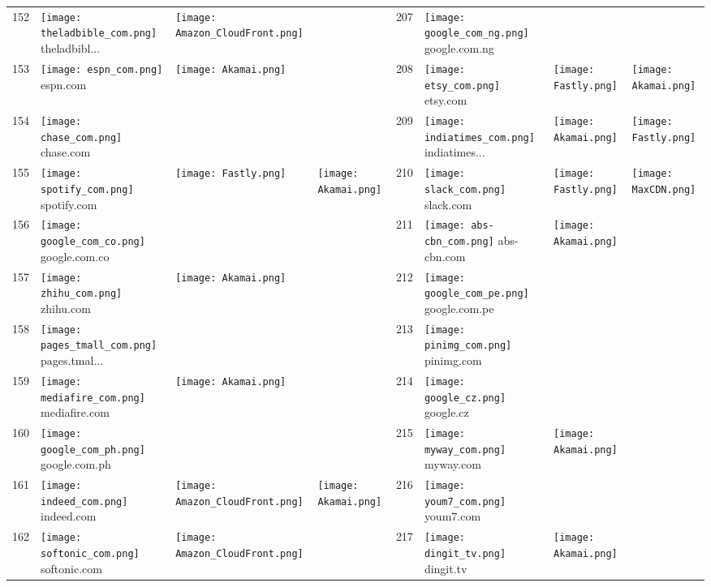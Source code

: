 \begin{table}[]
\begin{tabular}{|llll|llll|}
152 & \texttt{[image: theladbible\_com.png]} theladbibl... & \texttt{[image: Amazon\_CloudFront.png]} & & 207 & \texttt{[image: google\_com\_ng.png]} google.com.ng & & \\
153 & \texttt{[image: espn\_com.png]} espn.com & \texttt{[image: Akamai.png]} & & 208 & \texttt{[image: etsy\_com.png]} etsy.com & \texttt{[image: Fastly.png]} & \texttt{[image: Akamai.png]} \\
154 & \texttt{[image: chase\_com.png]} chase.com & & & 209 & \texttt{[image: indiatimes\_com.png]} indiatimes... & \texttt{[image: Akamai.png]} & \texttt{[image: Fastly.png]} \\
155 & \texttt{[image: spotify\_com.png]} spotify.com & \texttt{[image: Fastly.png]} & \texttt{[image: Akamai.png]} & 210 & \texttt{[image: slack\_com.png]} slack.com & \texttt{[image: Fastly.png]} & \texttt{[image: MaxCDN.png]} \\
156 & \texttt{[image: google\_com\_co.png]} google.com.co & & & 211 & \texttt{[image: abs-cbn\_com.png]} abs-cbn.com & \texttt{[image: Akamai.png]} & \\
157 & \texttt{[image: zhihu\_com.png]} zhihu.com & \texttt{[image: Akamai.png]} & & 212 & \texttt{[image: google\_com\_pe.png]} google.com.pe & & \\
158 & \texttt{[image: pages\_tmall\_com.png]} pages.tmal... & & & 213 & \texttt{[image: pinimg\_com.png]} pinimg.com & & \\
159 & \texttt{[image: mediafire\_com.png]} mediafire.com & \texttt{[image: Akamai.png]} & & 214 & \texttt{[image: google\_cz.png]} google.cz & & \\
160 & \texttt{[image: google\_com\_ph.png]} google.com.ph & & & 215 & \texttt{[image: myway\_com.png]} myway.com & \texttt{[image: Akamai.png]} & \\
161 & \texttt{[image: indeed\_com.png]} indeed.com & \texttt{[image: Amazon\_CloudFront.png]} & \texttt{[image: Akamai.png]} & 216 & \texttt{[image: youm7\_com.png]} youm7.com & & \\
162 & \texttt{[image: softonic\_com.png]} softonic.com & \texttt{[image: Amazon\_CloudFront.png]} & & 217 & \texttt{[image: dingit\_tv.png]} dingit.tv & \texttt{[image: Akamai.png]} & \\

\end{tabular}
\end{table}
